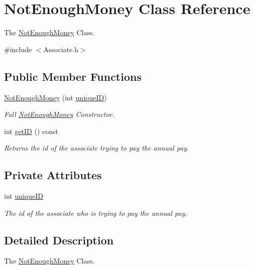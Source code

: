 \hypertarget{classNotEnoughMoney}{}\section{Not\+Enough\+Money Class Reference}
\label{classNotEnoughMoney}


The \hyperlink{classNotEnoughMoney}{Not\+Enough\+Money} Class.  




{\ttfamily \#include $<$Associate.\+h$>$}

\subsection*{Public Member Functions}
\begin{DoxyCompactItemize}
\item 
\hyperlink{classNotEnoughMoney_a8d626cbca191437e4c16f3d058a7d204}{Not\+Enough\+Money} (int \hyperlink{classNotEnoughMoney_a448ce0cf6fa4322dca36d379c3b94028}{unique\+ID})
\begin{DoxyCompactList}\small\item\em Full \hyperlink{classNotEnoughMoney}{Not\+Enough\+Money} Constructor. \end{DoxyCompactList}\item 
int \hyperlink{classNotEnoughMoney_a7f6054f81a4a84f1e9f2cb3f24fc498b}{get\+ID} () const
\begin{DoxyCompactList}\small\item\em Returns the id of the associate trying to pay the annual pay. \end{DoxyCompactList}\end{DoxyCompactItemize}
\subsection*{Private Attributes}
\begin{DoxyCompactItemize}
\item 
int \hyperlink{classNotEnoughMoney_a448ce0cf6fa4322dca36d379c3b94028}{unique\+ID}
\begin{DoxyCompactList}\small\item\em The id of the associate who is trying to pay the annual pay. \end{DoxyCompactList}\end{DoxyCompactItemize}


\subsection{Detailed Description}
The \hyperlink{classNotEnoughMoney}{Not\+Enough\+Money} Class. 

